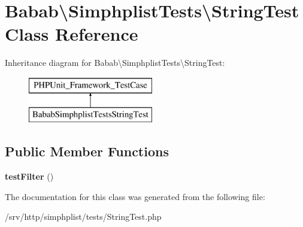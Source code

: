 \hypertarget{classBabab_1_1SimphplistTests_1_1StringTest}{\section{Babab\textbackslash{}Simphplist\+Tests\textbackslash{}String\+Test Class Reference}
\label{classBabab_1_1SimphplistTests_1_1StringTest}
}
Inheritance diagram for Babab\textbackslash{}Simphplist\+Tests\textbackslash{}String\+Test\+:\begin{figure}[H]
\begin{center}
\leavevmode
\includegraphics[height=2.000000cm]{classBabab_1_1SimphplistTests_1_1StringTest}
\end{center}
\end{figure}
\subsection*{Public Member Functions}
\begin{DoxyCompactItemize}
\item 
\hypertarget{classBabab_1_1SimphplistTests_1_1StringTest_a76d9ae67ee8ef0781a3f59ecc4496449}{{\bfseries test\+Filter} ()}\label{classBabab_1_1SimphplistTests_1_1StringTest_a76d9ae67ee8ef0781a3f59ecc4496449}

\end{DoxyCompactItemize}


The documentation for this class was generated from the following file\+:\begin{DoxyCompactItemize}
\item 
/srv/http/simphplist/tests/String\+Test.\+php\end{DoxyCompactItemize}
